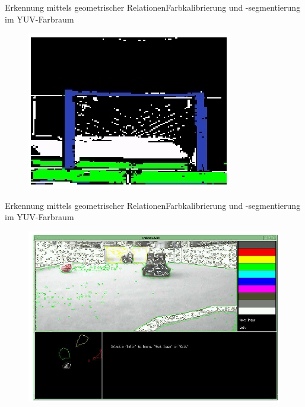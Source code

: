 \documentclass{beamer}
\begin{document}
\begin{frame}{Erkennung mittels geometrischer Relationen}{Farbkalibrierung und -segmentierung im YUV-Farbraum}
\begin{figure}[htp]
\centering
\includegraphics[scale=0.9]{segmented-view2.png}
\end{figure}
\end{frame}

\begin{frame}{Erkennung mittels geometrischer Relationen}{Farbkalibrierung und -segmentierung im YUV-Farbraum}
\begin{figure}[htp]
\centering
\includegraphics[scale=0.4]{training-tool.png}
\end{figure}
\end{frame}
\end{document}
